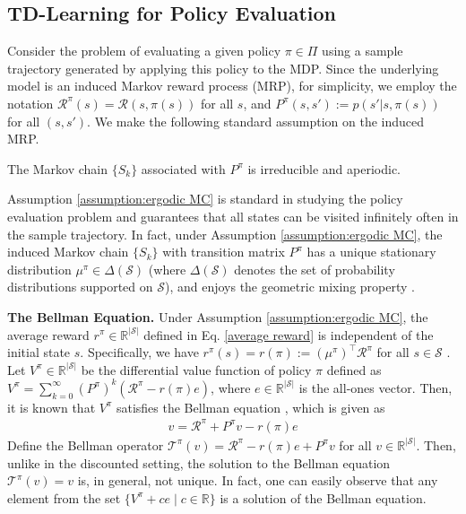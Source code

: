 \documentclass[11 pt]{article}
\begin{document}
	\subsection{TD-Learning for Policy Evaluation}
	Consider the problem of evaluating a given policy $\pi \in \Pi$ using a sample trajectory generated by applying this policy to the MDP. Since the underlying model is an induced Markov reward process (MRP), for simplicity, we employ the notation $\mathcal{R}^\pi(s)= \mathcal{R}(s, \pi(s))$ for all $s$, and $P^\pi(s,s'):= p(s'|s,\pi(s))$ for all $(s,s')$. We make the following standard assumption on the induced MRP.
	\begin{assumption}
		\label{assumption:ergodic MC}
		The Markov chain $\{S_k\}$ associated with $P^\pi$ is irreducible and aperiodic.
	\end{assumption}
	
	Assumption \ref{assumption:ergodic MC} is standard in studying the policy evaluation problem \cite{tsitsiklis1997analysis,tsitsiklis1999average,bhandari2018finite} and guarantees that all states can be visited infinitely often in the sample trajectory. In fact, under Assumption \ref{assumption:ergodic MC}, the induced Markov chain $\{S_k\}$ with transition matrix $P^\pi$ has a unique stationary distribution $\mu^\pi\in\Delta(\mathcal{S})$ (where $\Delta(\mathcal{S})$ denotes the set of probability distributions supported on $\mathcal{S}$), and enjoys the geometric mixing property \cite{levin2017markov}.
	
	
	\vspace{3 mm}
	\noindent\textbf{The Bellman Equation.} Under Assumption \ref{assumption:ergodic MC}, the average reward $r^{\pi}\in\mathbb{R}^{|\mathcal{S}|}$ defined in Eq. \eqref{average reward} is independent of the initial state $s$. Specifically, we have $r^\pi(s) = r(\pi) := (\mu^{\pi})^\top\mathcal{R}^\pi$ for all $s \in \mathcal{S}$ \cite{puterman2014markov}. Let $V^\pi\in\mathbb{R}^{|\mathcal{S}|}$ be the differential value function of policy $\pi$ defined as $V^{\pi} = \sum^\infty_{k=0} \left(P^\pi \right)^k (\mathcal{R}^\pi - r(\pi) e)$,
	where $e \in \mathbb{R}^{|\mathcal{S}|}$ is the all-ones vector.
	Then, it is known that $V^\pi$ satisfies the Bellman equation \cite{puterman2014markov}, which is given as
	\begin{align}\label{eq:poisson_eq}
		v=\mathcal{R}^\pi + P^\pi v - r(\pi)e
	\end{align}
	Define the Bellman operator $\mathcal{T}^\pi(v) = \mathcal{R}^\pi - r(\pi)e + P^\pi v$
	for all $v\in\mathbb{R}^{|\mathcal{S}|}$.
	Then, unlike in the discounted setting, the solution to the Bellman equation $\mathcal{T}^\pi(v) = v$ is, in general, not unique. In fact, one can easily observe that any element from the set $\{V^{\pi} + ce \mid c \in \mathbb{R}\}$ is a solution of the Bellman equation. 
	
\end{document}
